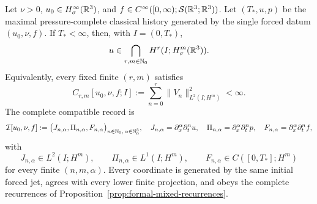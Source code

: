 \begin{theorem}
\label{thm:datum-intersection}
Let \(\nu>0\), \(u_0\in H^\infty_\sigma(\mathbb R^3)\), and
\(f\in C^\infty([0,\infty);\mathcal S(\mathbb R^3;\mathbb R^3))\). Let
\((T_*,u,p)\) be the maximal pressure-complete classical history generated
by the single forced datum \((u_0,\nu,f)\). If \(T_*<\infty\), then, with
\(I=(0,T_*)\),
\begin{equation}
 u\in\bigcap_{r,m\in\mathbb N_0}H^r(I;H^m_\sigma(\mathbb R^3)).
 \label{eq:independent-mixed-intersection}
\end{equation}
Equivalently, every fixed finite \((r,m)\) satisfies
\begin{equation}
 C_{r,m}[u_0,\nu,f;I]
 :=\sum_{n=0}^r\|V_n\|_{L^2(I;H^m)}^2<\infty.
 \label{eq:direct-datum-terminal-membership}
\end{equation}
The complete compatible record is
\begin{equation}
 \mathcal I[u_0,\nu,f]:=
 \bigl(J_{n,\alpha},\Pi_{n,\alpha},F_{n,\alpha}\bigr)_{n\in\mathbb N_0,\,\alpha\in\mathbb N_0^3},
 \quad
 J_{n,\alpha}=\partial_x^\alpha\partial_t^nu,\quad
 \Pi_{n,\alpha}=\partial_x^\alpha\partial_t^np,\quad
 F_{n,\alpha}=\partial_x^\alpha\partial_t^nf,
 \label{eq:independent-intersection-record}
\end{equation}
with
\[
 J_{n,\alpha}\in L^2(I;H^m),\qquad
 \Pi_{n,\alpha}\in L^1(I;H^m),\qquad
 F_{n,\alpha}\in C([0,T_*];H^m)
\]
for every finite \((n,m,\alpha)\). Every coordinate is generated by the same
initial forced jet, agrees with every lower finite projection, and obeys the
complete recurrences of Proposition~\ref{prop:formal-mixed-recurrences}.
\end{theorem}


